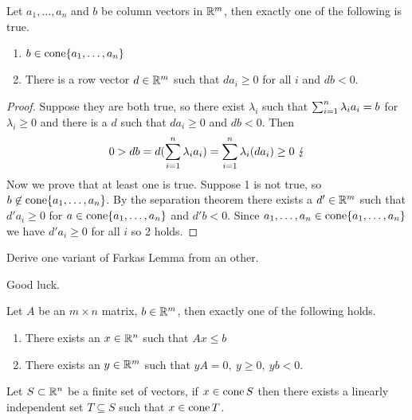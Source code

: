\documentclass{exam}
\begin{document}
    \begin{theorem}
        Let $a_1,\dots ,a_n$ and $b$ be column vectors in $\mathbb{R}^m$, then exactly one of the following is true.
        \begin{enumerate}
            \item $b \in \operatorname{\mathop{cone}}\{a_1,\dots,a_n\}$
            \item There is a row vector $d \in \mathbb{R}^m$ such that $d a_i \ge 0$ for all $i$ and $db <0$.
        \end{enumerate}
    \end{theorem}
    \begin{proof}
        Suppose they are both true, so there exist $\lambda_i$ such that $\sum_{i=1}^n \lambda_i a_i = b$ for $\lambda_i \ge 0$ and there is a $d$ such that $d a_i \ge 0$ and $db <0$.
        Then
        \[
            0 > db = d (\sum_{i=1}^n \lambda_i a_i) = \sum_{i=1}^n \lambda_i (d a_i) \ge 0\ \lightning
        \]
        Now we prove that at least one is true.
        Suppose 1 is not true, so $b \not \in \operatorname{\mathop{cone}}\{a_1,\dots,a_n\}$.
        By the separation theorem there exists a $d' \in \mathbb{R}^m$ such that $d' a_i \ge 0$ for $a \in \operatorname{\mathop{cone}}\{a_1,\dots,a_n\}$ and $d'b <0$.
        Since $a_1,\dots,a_n \in \operatorname{\mathop{cone}}\{a_1,\dots,a_n\}$ we have $d' a_i \ge 0$ for all $i$ so 2 holds.
    \end{proof}
    \begin{question}
        Derive one variant of Farkas Lemma from an other.
    \end{question}
    \begin{answer}
        Good luck.
    \end{answer}
    \begin{theorem}
        Let $A$ be an $m \times n$ matrix, $b \in \mathbb{R}^m$, then exactly one of the following holds.
        \begin{enumerate}
            \item There exists an $x \in \mathbb{R}^n$ such that $Ax\le b$
            \item There exists an $y \in \mathbb{R}^m$ such that $yA=0,\ y\ge 0,\ yb<0$.
        \end{enumerate}
    \end{theorem}
    \begin{theorem}
        Let $S \subset \mathbb{R}^n$ be a finite set of vectors, if $x \in \operatorname{\mathop{cone}} S$ then there exists a linearly independent set $T \subseteq S$ such that $x \in \operatorname{\mathop{cone}} T$.
    \end{theorem}
\end{document}
